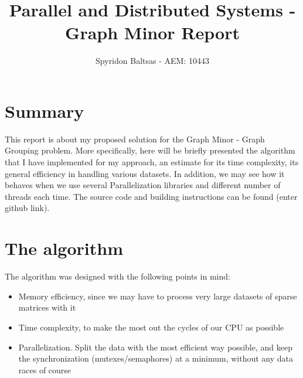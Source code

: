 \documentclass[11pt]{article}
\author{Spyridon Baltsas - AEM: 10443}
\date{}
\title{Parallel and Distributed Systems - Graph Minor Report}
\begin{document}
\maketitle

\section{Summary}
\label{sec:org953e5d6}
This report is about my proposed solution for the Graph Minor - Graph Grouping problem. More specifically, here will be briefly presented the algorithm that I have implemented for my approach, an estimate for its time complexity, its general efficiency in handling various datasets. In addition, we may see how it behaves when we use several Parallelization libraries and different number of threads each time. The source code and building instructions can be found (enter github link).
\section{The algorithm}
\label{sec:org5d84154}
The algorithm was designed with the following points in mind:
\begin{itemize}
\item Memory efficiency, since we may have to process very large datasets of sparse matrices with it
\item Time complexity, to make the most out the cycles of our CPU as possible
\item Parallelization. Split the data with the most efficient way possible, and keep the synchronization (mutexes/semaphores) at a minimum, without any data races of course
\end{itemize}
\end{document}

